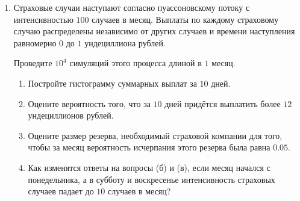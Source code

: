 \begin{enumerate}
\item Страховые случаи наступают согласно пуассоновскому потоку с интенсивностью $100$ случаев в месяц. 
Выплаты по каждому страховому случаю распределены независимо от других случаев и времени наступления равномерно $0$ до $1$ ундециллиона рублей. 

Проведите $10^4$ симуляций этого процесса длиной в $1$ месяц. 

\begin{enumerate}
    \item Постройте гистограмму суммарных выплат за $10$ дней. 
    \item Оцените вероятность того, что за $10$ дней придётся выплатить более $12$ ундециллионов рублей. 
    \item Оцените размер резерва, необходимый страховой компании для того, чтобы за месяц вероятность исчерпания этого резерва была равна $0.05$.
    \item Как изменятся ответы на вопросы (б) и (в), если месяц начался с понедельника, а в субботу и воскресенье интенсивность страховых случаев падает до $10$ случаев в месяц?
\end{enumerate}


\end{enumerate}
